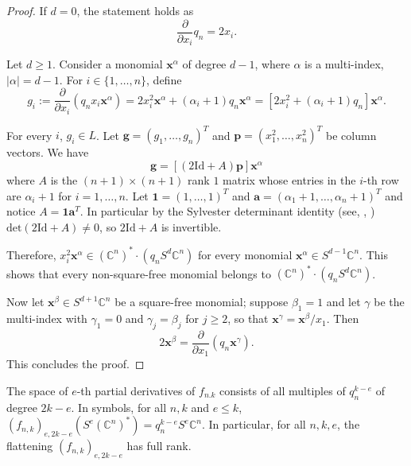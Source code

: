 \documentclass{toc}
\newcommand{\vvirg}{ , \dots , }
\newcommand{\bfa}{\mathbf{a}}
\newcommand{\bfg}{\mathbf{g}}
\newcommand{\bfp}{\mathbf{p}}
\newcommand{\bfx}{\mathbf{x}}
\newcommand{\Id}{\mathrm{Id}}
\renewcommand{\det}{\mathrm{det}}
\def\BC{\mathbb C}
\begin{document}
\begin{proof}
If $d = 0$, the statement holds as 
\[
\frac{\partial}{\partial x_i} q_n = 2x_i.
 \]

Let $d \geq 1$. Consider a monomial $\bfx ^\alpha$ of degree $d-1$, where $\alpha$ is a multi-index, $\vert \alpha \vert = d-1$. For   $i\in \{ 1\vvirg n\}$,  define 
\[
g_i := \frac{\partial}{\partial x_i}(q_n x_i \bfx^\alpha  ) = 2x_i^2 \bfx^\alpha    + (\alpha_i+1)q_n \bfx^\alpha  = \left[ 2x_i^2 + (\alpha_i+1)q_n \right] \bfx^\alpha.
\]

For every $i$, $g_i \in L$. Let $\bfg = (g_1 \vvirg g_n)^T$ and $\bfp = (x_1^2 \vvirg x_n^2)^T$ be column vectors. We have
\[
 \bfg =  \left[ (2\Id + A) \bfp \right] \bfx^\alpha
\]
where $A$ is the $(n+1) \times (n+1)$ rank $1$ matrix whose entries in the $i$-th row are $\alpha_i + 1$ for $i=1 \vvirg n$. Let $\mathbf{1} = (1 \vvirg 1 )^T$ and $\bfa = (\alpha_1+1 \vvirg \alpha_n+1)^T$ and notice $A = \mathbf{1} \bfa ^T$. In particular by the Sylvester determinant identity (see, \eg, \cite[Chap. 1, Prob. 3.1]{MR1277174}) $\det(2\Id+A) \neq 0$, so $2 \Id + A$ is invertible.

Therefore, $x_i^2 \bfx^\alpha \in (\BC^{n})^* \cdot \left( q_nS^d \BC^{n} \right)$ for every monomial $\bfx^\alpha \in S^{d-1}\BC^{n}$. This shows that every non-square-free monomial belongs to $(\BC^{n})^* \cdot (q_n S^d\BC^{n})$.

Now let $\bfx^\beta \in S^{d+1}\BC^{n}$ be a square-free monomial; suppose $\beta_1 = 1$ and let $\gamma$ be the multi-index with $\gamma_1 = 0$ and $\gamma_j = \beta_j$ for $j\geq 2$, so that $\bfx^\gamma = \bfx^\beta / x_1$. Then 
\[
2\bfx^\beta = \frac{\partial}{\partial x_1} (q_n \bfx^\gamma).
\]
This concludes the proof.
\end{proof}



\begin{theorem}\label{thm: flattenings of qk hit everything} 
The space of $e$-th partial derivatives  of $f_{n.k}$ consists of all multiples of $q_n^{k-e}$ of degree $2k-e$. In symbols, for all  $n,k$ and $e\leq k$,   $(f_{n,k})_{e,2k-e}(S^e (\BC^{n})^*)= q_n^{k-e} S^e \BC^{n}$. In particular, for all $n,k,e$, the flattening $(f_{n,k})_{e,2k-e}$ has full rank.
\end{theorem}
 
\end{document}
